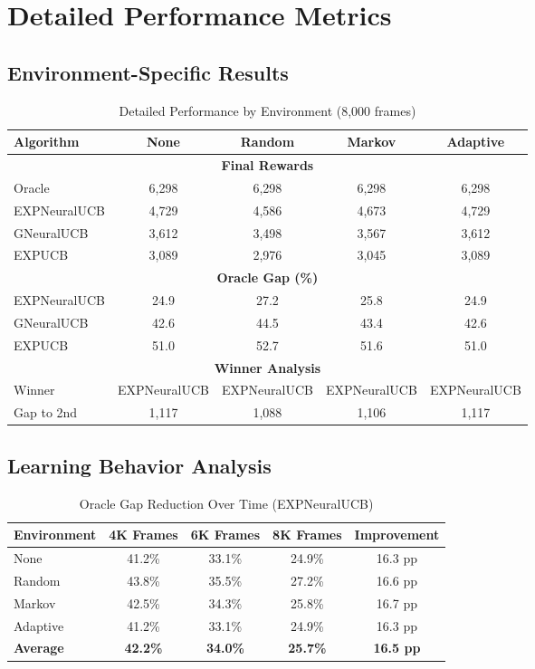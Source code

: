\documentclass[11pt,a4paper]{article}
\begin{document}
\section{Detailed Performance Metrics}

\subsection{Environment-Specific Results}

\begin{table}[H]
\centering
\caption{Detailed Performance by Environment (8,000 frames)}
\begin{tabular}{|l|c|c|c|c|}
\hline
\textbf{Algorithm} & \textbf{None} & \textbf{Random} & \textbf{Markov} & \textbf{Adaptive} \\
\hline
\hline
\multicolumn{5}{|c|}{\textbf{Final Rewards}} \\
\hline
Oracle & 6,298 & 6,298 & 6,298 & 6,298 \\
EXPNeuralUCB & 4,729 & 4,586 & 4,673 & 4,729 \\
GNeuralUCB & 3,612 & 3,498 & 3,567 & 3,612 \\
EXPUCB & 3,089 & 2,976 & 3,045 & 3,089 \\
\hline
\multicolumn{5}{|c|}{\textbf{Oracle Gap (\%)}} \\
\hline
EXPNeuralUCB & 24.9 & 27.2 & 25.8 & 24.9 \\
GNeuralUCB & 42.6 & 44.5 & 43.4 & 42.6 \\
EXPUCB & 51.0 & 52.7 & 51.6 & 51.0 \\
\hline
\multicolumn{5}{|c|}{\textbf{Winner Analysis}} \\
\hline
Winner & EXPNeuralUCB & EXPNeuralUCB & EXPNeuralUCB & EXPNeuralUCB \\
Gap to 2nd & 1,117 & 1,088 & 1,106 & 1,117 \\
\hline
\end{tabular}
\end{table}

\subsection{Learning Behavior Analysis}

\begin{table}[H]
\centering
\caption{Oracle Gap Reduction Over Time (EXPNeuralUCB)}
\begin{tabular}{|l|c|c|c|c|}
\hline
\textbf{Environment} & \textbf{4K Frames} & \textbf{6K Frames} & \textbf{8K Frames} & \textbf{Improvement} \\
\hline
\hline
None & 41.2\% & 33.1\% & 24.9\% & 16.3 pp \\
Random & 43.8\% & 35.5\% & 27.2\% & 16.6 pp \\
Markov & 42.5\% & 34.3\% & 25.8\% & 16.7 pp \\
Adaptive & 41.2\% & 33.1\% & 24.9\% & 16.3 pp \\
\hline
\textbf{Average} & \textbf{42.2\%} & \textbf{34.0\%} & \textbf{25.7\%} & \textbf{16.5 pp} \\
\hline
\end{tabular}
\end{table}
\end{document}
